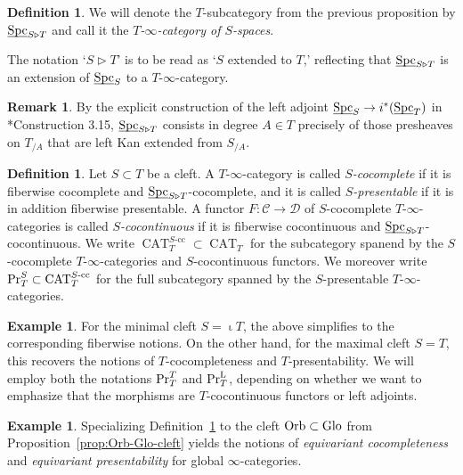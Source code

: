 \documentclass[reqno]{memo-l}
\theoremstyle{mythm}
\theoremstyle{definition}
\newtheorem{rk}[thm]{Remark}
\newtheorem{ex}[thm]{Example}
\newtheorem{definition}[thm]{Definition}
\numberwithin{equation}{section}
\newcommand{\Cc}{{\mathcal{C}}}
\newcommand{\Dd}{{\mathcal{D}}}
\DeclareMathOperator{\Spc}{Spc}
\DeclareMathOperator{\CAT}{CAT}
\newcommand{\PrLT}{\textup{Pr}^{\textup{L}}_{T}}
\DeclareMathOperator{\core}{\iota}
\renewcommand{\Pr}{\textup{Pr}}
\newcommand{\Orb}{{\vphantom{\textup{t}}\smash{\textup{Orb}}}}
\newcommand{\Glo}{\textup{Glo}}
\newcommand{\ulhelper}[2]{\underline{\setbox0=\hbox{$#1#2$}\dp0=0.4pt \box0\relax}}
\newcommand{\ul}[1]{{\mathpalette\ulhelper{#1}}\hbox{\rule[-2pt]{0pt}{0pt}}}
\begin{document}
\begin{definition}
    We will denote the $T$-subcategory from the previous proposition by $\ul\Spc_{S\triangleright T}$ and call it the \emph{$T$-$\infty$-category of $S$-spaces}.
\end{definition}

The notation `$S\triangleright T$' is to be read as `$S$ extended to $T$,' reflecting that $\ul\Spc_{S\triangleright T}$ is an extension of $\ul\Spc_S$ to a $T$-$\infty$-category.

\begin{rk}\label{rk:Spc-S-T-as-LKE}
    By the explicit construction of the left adjoint $\ul\Spc_S\to i^*(\ul\Spc_T)$ in \cite{CLL_Clefts}*{Construction 3.15}, $\ul\Spc_{S\triangleright T}$ consists in degree $A\in T$ precisely of those presheaves on $T_{/A}$ that are left Kan extended from $S_{/A}$. \end{rk}

\begin{definition}\label{def:S-cc}
    Let $S\subset T$ be a cleft. A $T$-$\infty$-category is called \emph{$S$-cocomplete} if it is fiberwise cocomplete and $\ul\Spc_{S\triangleright T}$-cocomplete, and it is called \emph{$S$-presentable} if it is in addition fiberwise presentable. A functor $F\colon\Cc\to\Dd$ of $S$-cocomplete $T$-$\infty$-categories is called \emph{$S$-cocontinuous} if it is fiberwise cocontinuous and $\ul\Spc_{S\triangleright T}$-cocontinuous.
    We write $\CAT_T^\text{$S$-cc}\subset\CAT_T$ for the subcategory spanend by the $S$-cocomplete $T$-$\infty$-categories and $S$-cocontinuous functors. We moreover write $\Pr^S_T\subset\CAT_T^\text{$S$-cc}$ for the full subcategory spanned by the $S$-presentable $T$-$\infty$-categories.
\end{definition}

\begin{ex}
    For the minimal cleft $S=\core T$, the above simplifies to the corresponding fiberwise notions.     
    On the other hand, for the maximal cleft $S=T$, this recovers the notions of $T$-cocompleteness and $T$-presentability. We will employ both the notations $\Pr^T_T$ and $\PrLT$, depending on whether we want to emphasize that the morphisms are $T$-cocontinuous functors or left adjoints.
\end{ex}

\begin{ex}
    Specializing Definition~\ref{def:S-cc} to the cleft $\Orb\subset\Glo$ from Proposition~\ref{prop:Orb-Glo-cleft} yields the notions of \emph{equivariant cocompleteness} and \emph{equivariant presentability} for global $\infty$-categories.
\end{ex}
\end{document}
